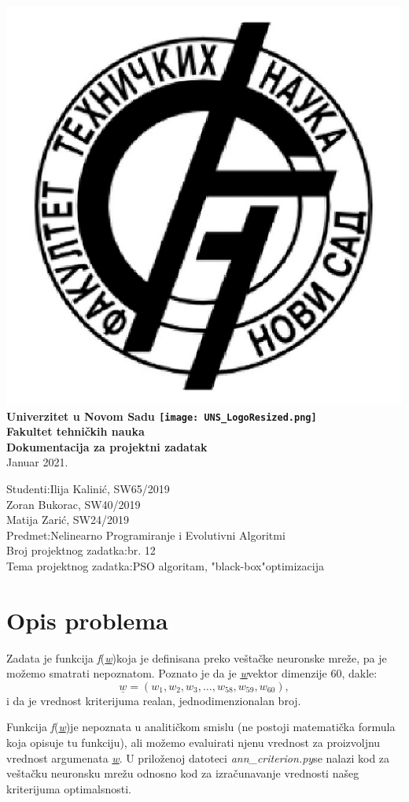 \documentclass[12pt, a4paper]{article}
\newcommand{\vecw}{\underline{\textit{w}}}
\newcommand{\fw}{\textit{f}(\vecw)}
\DeclareRobustCommand{\ftnlogo}{%
  \begingroup\normalfont
  \includegraphics[height=4\fontcharht\font`\B]{FTN_LogoResized.png}%
  \endgroup
}
\DeclareRobustCommand{\unslogo}{%
  \begingroup\normalfont
  \texttt{[image: UNS\_LogoResized.png]}%
  \endgroup
}
\begin{document}
    \begin{titlepage}
        \begin{center}
        \huge{\textbf{\ftnlogo Univerzitet u Novom Sadu \unslogo\\ [12pt]  Fakultet tehničkih nauka}}\\
        \vspace{55mm}
        \LARGE{\textbf{Dokumentacija za projektni zadatak}}\\
        \vspace{35mm}
        Januar 2021.
        \vspace{35mm}
        \end{center}
        \begin{flushright}
            Studenti:\hfill Ilija Kalinić, SW65/2019\\
                            Zoran Bukorac, SW40/2019\\
                            Matija Zarić, SW24/2019\\
            \vspace{3pt}
            Predmet:\hfill Nelinearno Programiranje i Evolutivni Algoritmi\\
            \vspace{3pt}
            Broj projektnog zadatka:\hfill br. 12\\
            \vspace{3pt}
            Tema projektnog zadatka:\hfill PSO algoritam, "black-box"optimizacija\\
        \end{flushright}
        
    
    \end{titlepage}

    \section{Opis problema}
    Zadata je funkcija \fw\space koja je definisana preko veštačke neuronske mreže, pa je možemo smatrati nepoznatom.
    Poznato je da je \vecw\space vektor dimenzije 60, dakle:
    \begin{equation}
    \vecw = ( w_1, w_2, w_3, \ldots, w_{58}, w_{59}, w_{60} ),
    \end{equation}
    i da je vrednost kriterijuma realan, jednodimenzionalan broj.
    
    Funkcija \fw\space je nepoznata u analitičkom smislu (ne postoji matematička formula koja
    opisuje tu funkciju), ali možemo evaluirati njenu vrednost za proizvoljnu vrednost argumenata
    \vecw.
    U priloženoj datoteci \textit{ann\_criterion.py}\space se nalazi kod za veštačku neuronsku
    mrežu odnosno kod za izračunavanje vrednosti našeg kriterijuma optimalsnosti. \\
\end{document}
